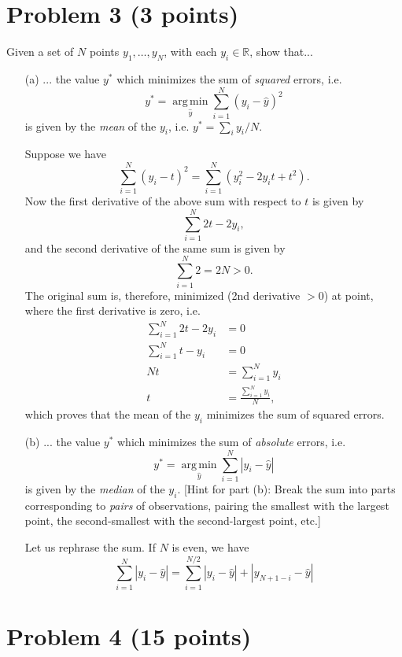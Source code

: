 \documentclass[10pt]{article}
\DeclareMathOperator*{\argmin}{arg\, min}
\begin{document}
\color{blue}
\section*{Problem 3 (3 points)}
Given a set of $N$ points $y_1, \dots, y_N$, with each $y_i \in \mathbb{R}$, show that...
\begin{itemize}
  \item[(a)] ... the value $y^{\ast}$ which minimizes the sum of \textit{squared} errors, i.e.
 \[
 y^{\ast} = \underset{\hat{y}}{\argmin} \sum_{i = 1}^N (y_i - \hat{y})^2
 \]
 is given by the \textit{mean} of the $y_i$, i.e. $y^\ast = \sum_i y_i / N$.
 
 \color{black} 
 Suppose we have 
 \[
 \sum_{i = 1}^N (y_i - t)^2 = \sum_{i = 1}^N (y_i^2 - 2y_it + t^2).
 \]
 Now the first derivative of the above sum with respect to $t$ is given by
 \[
 \sum_{i = 1}^N 2t - 2y_i,
 \]
 and the second derivative of the same sum is given by
 \[
 \sum_{i = 1}^N 2 = 2N > 0.
 \]
 The original sum is, therefore, minimized (2nd derivative $> 0$) at point, where the first derivative is zero, i.e.
 \begin{align*}
 \sum_{i = 1}^N 2t - 2y_i &= 0 \\
 \sum_{i = 1}^N t - y_i &= 0 \\
 Nt &= \sum_{i = 1}^N y_i \\
 t &= \frac{\sum_{i = 1}^N y_i}{N},
 \end{align*}
 which proves that the mean of the $y_i$ minimizes the sum of squared errors.
 
 \color{blue}
 \item[(b)] ... the value $y^{\ast}$ which minimizes the sum of \textit{absolute} errors, i.e.
 \[
 y^\ast = \underset{\hat{y}}{\argmin} \sum_{i = 1}^N |y_i - \hat{y}|
 \] 
 is given by the \textit{median} of the $y_i$. [Hint for part (b): Break the sum into parts corresponding to \textit{pairs} of observations, pairing the smallest with the largest point, the second-smallest with the second-largest point, etc.]
 
 \color{black}
 Let us rephrase the sum. If $N$ is even, we have
 \[
 \sum_{i = 1}^N |y_i - \hat{y}| = \sum_{i = 1}^{N / 2} |y_i - \hat{y}| + |y_{N + 1 - i} - \hat{y}|
 \]
\end{itemize}

\color{blue}
\section*{Problem 4 (15 points)}
\end{document}
